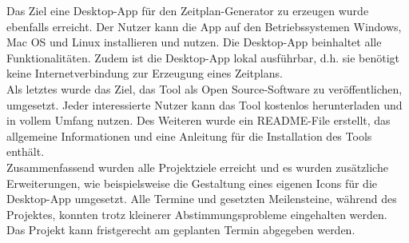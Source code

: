 Das Ziel eine Desktop-App für den Zeitplan-Generator zu erzeugen wurde ebenfalls erreicht. Der Nutzer kann die App auf den Betriebssystemen Windows, Mac OS und Linux installieren und nutzen. Die Desktop-App beinhaltet alle Funktionalitäten. Zudem ist die Desktop-App lokal ausführbar, d.h. sie benötigt keine Internetverbindung zur Erzeugung eines Zeitplans.\\
Als letztes wurde das Ziel, das Tool als Open Source-Software zu veröffentlichen, umgesetzt. Jeder interessierte Nutzer kann das Tool kostenlos herunterladen und in vollem Umfang nutzen. Des Weiteren wurde ein README-File erstellt, das allgemeine Informationen und eine Anleitung für die Installation des Tools enthält.\\
Zusammenfassend wurden alle Projektziele erreicht und es wurden zusätzliche Erweiterungen, wie beispielsweise die Gestaltung eines eigenen Icons für die Desktop-App umgesetzt. Alle Termine und gesetzten Meilensteine, während des Projektes, konnten trotz kleinerer Abstimmungsprobleme eingehalten werden. Das Projekt kann fristgerecht am geplanten Termin abgegeben werden.

